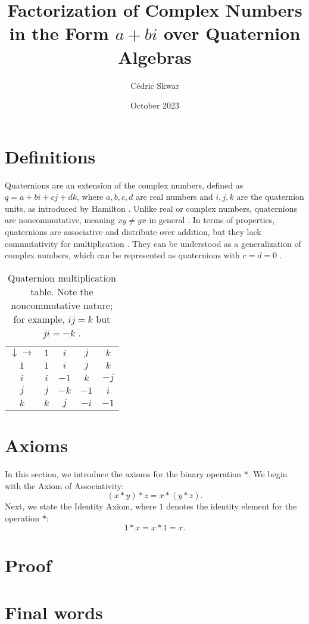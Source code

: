 \documentclass[a4paper]{article}
\title{Factorization of Complex Numbers in the Form \(a + bi\) over Quaternion Algebras}
\author{Cédric Skwar}
\date{October 2023}
\begin{document}
\maketitle

\section{Definitions}
Quaternions are an extension of the complex numbers, defined as \( q = a + bi + cj + dk \), where \( a, b, c, d \) are real numbers and \( i, j, k \) are the quaternion units, as introduced by Hamilton \cite{hamilton1847elements}. Unlike real or complex numbers, quaternions are noncommutative, meaning \( xy \neq yx \) in general \cite{conway1997quaternions}. 
In terms of properties, quaternions are associative and distribute over addition, but they lack commutativity for multiplication \cite{conway1997quaternions}. They can be understood as a generalization of complex numbers, which can be represented as quaternions with \( c = d = 0 \) \cite{kuipers1999quaternions}.
\begin{table}[h]
    \centering
    \begin{tabular}{ccccc}
        \( \downarrow \rightarrow \) & \( 1 \) & \( i \) & \( j \) & \( k \) \\
        \( 1 \) & \( 1 \) & \( i \) & \( j \) & \( k \) \\
        \( i \) & \( i \) & \( -1 \) & \( k \) & \( -j \) \\
        \( j \) & \( j \) & \( -k \) & \( -1 \) & \( i \) \\
        \( k \) & \( k \) & \( j \) & \( -i \) & \( -1 \) \\
    \end{tabular}
    \caption{Quaternion multiplication table. Note the noncommutative nature; for example, \( ij = k \) but \( ji = -k \) \cite{ward1997quaternions}.}
    \label{tab:mult_table}
\end{table}

\section{Axioms}
In this section, we introduce the axioms for the binary operation \(*\). We begin with the Axiom of Associativity:
\[
(x*y)*z=x*(y*z).
\]
Next, we state the Identity Axiom, where \(1\) denotes the identity element for the operation \(*\):
\[
1*x=x*1=x.
\]


\section{Proof}

\section{Final words}


\end{document}
